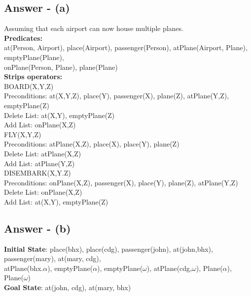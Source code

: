 \documentclass{article}
\begin{document}
\subsection{Answer - (a)}
Assuming that each airport can now house multiple planes. \\
\newline
\textbf{Predicates: }\\
\newline
at(Person, Airport), place(Airport), passenger(Person),
atPlane(Airport, Plane), emptyPlane(Plane), \\
onPlane(Person, Plane), plane(Plane) \\
\newline
\textbf{Strips operators: }\\
\newline
BOARD(X,Y,Z) \\
\-\hspace{10mm} Preconditions: at(X,Y,Z), place(Y), passenger(X), plane(Z), atPlane(Y,Z), emptyPlane(Z) \\
\-\hspace{10mm} Delete List: at(X,Y), emptyPlane(Z) \\
\-\hspace{10mm} Add List: onPlane(X,Z) \\
\newline
FLY(X,Y,Z) \\
\-\hspace{10mm} Preconditions: atPlane(X,Z), place(X), place(Y), plane(Z)\\
\-\hspace{10mm} Delete List: atPlane(X,Z) \\
\-\hspace{10mm} Add List: atPlane(Y,Z) \\
\newline
DISEMBARK(X,Y.Z) \\
\-\hspace{10mm} Preconditions: onPlane(X,Z), passenger(X), place(Y), plane(Z), atPlane(Y,Z) \\
\-\hspace{10mm} Delete List: onPlane(X,Z) \\
\-\hspace{10mm} Add List: at(X,Y), emptyPlane(Z) \\
\newline
\subsection{Answer - (b)}
\textbf{Initial State}: place(bhx),
place(cdg), passenger(john), at(john,bhx), passenger(mary), at(mary, cdg), \\
atPlane(bhx.$\alpha$), emptyPlane($\alpha$), emptyPlane($\omega$), atPlane(cdg,$\omega$), Plane($\alpha$), Plane($\omega$) \\
\newline 
\textbf{Goal State}: at(john, cdg), at(mary, bhx)
\end{document}
